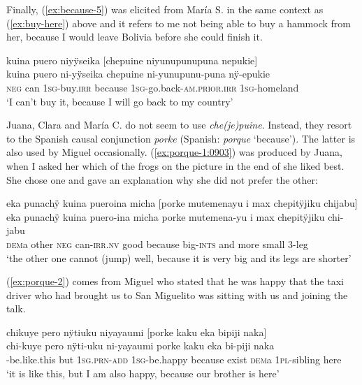 Finally, (\ref{ex:because-5}) was elicited from María S. in the same context as (\ref{ex:buy-here}) above and it refers to me not being able to buy a hammock from her, because I would leave Bolivia before she could finish it.
 
 \ea\label{ex:because-5}
\begingl
\glpreamble kuina puero niyÿseika \textup{[}chepuine niyunupunupuna nepukie\textup{]}\\
\gla kuina puero ni-yÿseika chepuine ni-yunupunu-puna nÿ-epukie\\
\glb \textsc{neg} can 1\textsc{sg}-buy.\textsc{irr} because 1\textsc{sg}-go.back-\textsc{am.prior.irr} 1\textsc{sg}-homeland\\
\glft ‘I can’t buy it, because I will go back to my country’
\endgl
\trailingcitation{[rxx-e181022le]}
\xe

Juana, Clara and María C. do not seem to use \textit{che(je)puine}. Instead, they resort to the Spanish causal conjunction \textit{porke} (Spanish: \textit{porque} ‘because’). The latter is also used by Miguel occasionally. (\ref{ex:porque-1:0903}) was produced by Juana, when I asked her which of the frogs on the picture in the end of  she liked best. She chose one and gave an explanation why she did not prefer the other:

\ea\label{ex:porque-1:0903}
\begingl
\glpreamble eka punachÿ kuina pueroina micha \textup{[}porke mutemenayu i max chepitÿjiku chijabu\textup{]}\\
\gla eka punachÿ kuina puero-ina micha porke mutemena-yu i max chepitÿjiku chi-jabu\\
\glb \textsc{dem}a other \textsc{neg} can-\textsc{irr.nv} good because big-\textsc{ints} and more small 3-leg\\
\glft ‘the other one cannot (jump) well, because it is very big and its legs are shorter’
\endgl
\trailingcitation{[jxx-a120516l-a.529-531]}
\xe

(\ref{ex:porque-2}) comes from Miguel who stated that he was happy that the taxi driver who had brought us to San Miguelito was sitting with us and joining the talk.

\ea\label{ex:porque-2}
\begingl
\glpreamble chikuye pero nÿtiuku niyayaumi \textup{[}porke kaku eka bipiji naka\textup{]}\\
\gla chi-kuye pero nÿti-uku ni-yayaumi porke kaku eka bi-piji naka\\
-be.like.this but 1\textsc{sg.prn}-\textsc{add} 1\textsc{sg}-be.happy because exist \textsc{dem}a 1\textsc{pl}-sibling here\\
\glft ‘it is like this, but I am also happy, because our brother is here’
\endgl
\trailingcitation{[mty-p110906l.208-209]}
\xe

